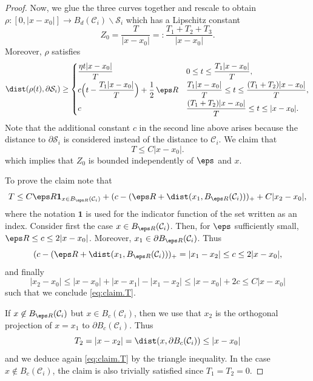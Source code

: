 \begin{proof}
Now, we glue the three curves together and rescale to obtain $\rho \colon [0,|x-x_0|] \to B_d(\mathcal C_i) \smallsetminus \mathcal S_i$ which has a Lipschitz constant
\begin{equation}
Z_0 = \frac{T}{|x-x_0|} =: \frac{ T_1 + T_2 +T_3}{|x-x_0|}.
\end{equation}
Moreover, $\rho$ satisfies
\begin{equation} \label{eq:rho}
\dist(\rho(t),\partial \mathcal S_i) \geq \begin{cases}
\dfrac{\eta t |x-x_0|}{T} & 0 \leq t \leq \dfrac{T_1 |x-x_0|}{T}, \\[5pt]
c\Bigl(t - \dfrac{T_1 |x-x_0|}{T}\Bigr) + \dfrac 1 2\, \eps R
& \dfrac{T_1 |x-x_0|}{T} \leq t \leq \dfrac{(T_1 + T_2) |x-x_0|}{T},\\[5pt]
c & \dfrac{(T_1 + T_2) |x-x_0|}{T} \leq t \leq |x-x_0|.
\end{cases}
\end{equation}
Note that the additional constant $c$ in the second line above arises because the distance to $\partial \mathcal S_i$ is considered instead of the distance to $\mathcal C_i$.
We claim that
\begin{equation} \label{eq:claim.T}
T \leq C |x- x_0|.
\end{equation}
which implies that $Z_0$ is bounded independently of $\eps$ and $x$.

To prove the claim note that
\begin{equation}
T \leq C \eps R \mathbf{1}_{x \in B_{\eps R}(\mathcal C_i)} + (c - (\eps R + \dist(x_1, B_{\eps R}(\mathcal C_i)))_+ + C|x_2 - x_0|,
\end{equation}
where the notation $ \mathbf{1}$ is used for the indicator function of the set written as an index.
Consider first the case $x \in B_{\eps R}(\mathcal C_i)$. Then, for $\eps$ sufficiently small, $\eps R \leq c \leq 2 |x - x_0|$. Moreover, $x_1 \in \partial B_{\eps R}(\mathcal C_i)$.
Thus
\begin{equation}
(c - (\eps R + \dist(x_1, B_{\eps R}(\mathcal C_i)))_+ = |x_1 - x_2| \leq c \leq 2 |x - x_0|,
\end{equation}
and finally
\begin{equation}
|x_2 - x_0| \leq |x-x_0| + |x - x_1| - |x_1 - x_2| \leq |x- x_0| + 2 c \leq C |x-x_0|
\end{equation}
such that we conclude \eqref{eq:claim.T}.

If $x \not \in B_{\eps R}(\mathcal C_i)$ but $x \in B_c(\mathcal C_i)$, then we use that $x_2$ is the orthogonal projection of $x=x_1$ to $\partial B_c(\mathcal C_i)$. Thus
\begin{equation}
T_2 = |x - x_2| = \dist(x,\partial B_c(\mathcal C_i)) \leq |x - x_0|
\end{equation}
and we deduce again \eqref{eq:claim.T} by the triangle inequality.
In the case $x \not \in B_c(\mathcal C_i)$, the claim is also trivially satisfied since $T_1 = T_2 = 0$.


\end{proof}
